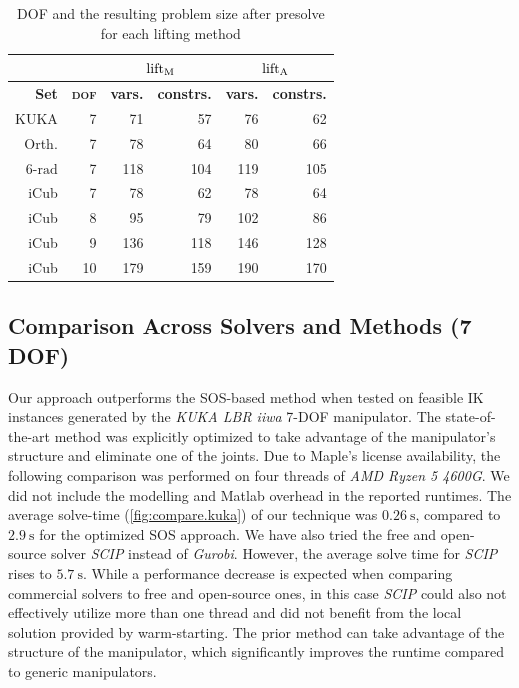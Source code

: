{\small
\begin{table}
\renewcommand{\arraystretch}{1.3}
\caption{{DOF} and the resulting problem size after presolve for each lifting method}
\label{tab:progsize}
\centering
\begin{tabular}{rr||rr|rr}
    \hline
    \multicolumn{2}{c||}{} & \multicolumn{2}{c|}{$\mathbf{\operatorname{lift}_\text{M}}$} & \multicolumn{2}{c}{$\operatorname{lift}_\text{A}$}\\
    \hline
    \bfseries{Set}  & \bfseries{\scshape{dof}} & \bfseries{vars.} & \bfseries{constrs.}  & \bfseries{vars.} & \bfseries{constrs.} \\
    \hline
    {KUKA}  &   7 &   71 &  57 &  76 &  62 \\
    {Orth.} &   7 &   78 &  64 &  80 &  66 \\
    {6-$\si{\radian}$} &   7 &  118 & 104 & 119 & 105 \\
    {iCub}  &   7 &   78 &  62 &  78 &  64 \\
    {iCub}  &   8 &   95 &  79 & 102 &  86 \\
    {iCub}  &   9 &  136 & 118 & 146 & 128 \\
    {iCub}  &  10 &  179 & 159 & 190 & 170 \\
    \hline
\end{tabular}
\end{table}
}

\subsection{Comparison Across Solvers and Methods (7 DOF)}
Our approach outperforms the SOS-based method \cite{trutman2022globally} when tested on feasible IK instances generated by the \emph{KUKA LBR iiwa} 7-DOF manipulator. The state-of-the-art method was explicitly optimized to take advantage of the manipulator's structure and eliminate one of the joints. Due to Maple's license availability, the following comparison was performed on four threads of \emph{AMD Ryzen 5 4600G}. We did not include the modelling and Matlab overhead in the reported runtimes. The average solve-time (\cref{fig:compare.kuka}) of our technique was $\qty{0.26}{\second}$, compared to $\qty{2.9}{\second}$ for the optimized SOS approach. We have also tried the free and open-source solver \emph{SCIP} instead of \emph{Gurobi}. However, the average solve time for \emph{SCIP} rises to $\qty{5.7}{\second}$. While a performance decrease is expected when comparing commercial solvers to free and open-source ones, in this case \emph{SCIP} could also not effectively utilize more than one thread and did not benefit from the local solution provided by warm-starting. The prior method can take advantage of the structure of the manipulator, which significantly improves the runtime compared to generic manipulators.

